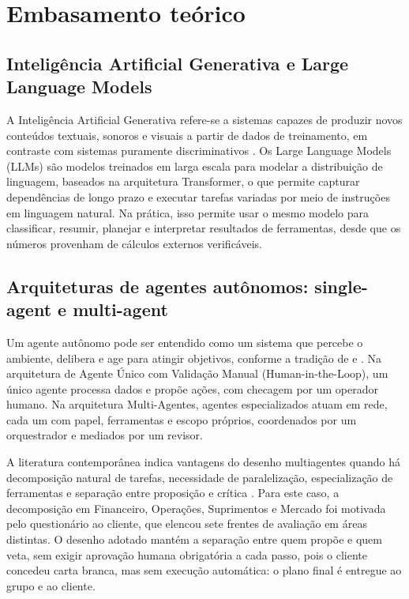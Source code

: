 \documentclass[12pt,a4paper,oneside,brazil]{abntex2}
\begin{document}
\chapter{Embasamento teórico}
\section{Inteligência Artificial Generativa e Large Language Models}

A Inteligência Artificial Generativa refere-se a sistemas capazes de produzir novos conteúdos textuais, sonoros e visuais a partir de dados de treinamento, em contraste com sistemas puramente discriminativos \cite{vaswani2017attention}. Os Large Language Models (LLMs) são modelos treinados em larga escala para modelar a distribuição de linguagem, baseados na arquitetura Transformer, o que permite capturar dependências de longo prazo e executar tarefas variadas por meio de instruções em linguagem natural. Na prática, isso permite usar o mesmo modelo para classificar, resumir, planejar e interpretar resultados de ferramentas, desde que os números provenham de cálculos externos verificáveis.

\section{Arquiteturas de agentes autônomos: single-agent e multi-agent}

Um agente autônomo pode ser entendido como um sistema que percebe o ambiente, delibera e age para atingir objetivos, conforme a tradição de \cite{russell2020artificial} e \cite{wooldridge2009multiagent}. Na arquitetura de Agente Único com Validação Manual (Human-in-the-Loop), um único agente processa dados e propõe ações, com checagem por um operador humano. Na arquitetura Multi-Agentes, agentes especializados atuam em rede, cada um com papel, ferramentas e escopo próprios, coordenados por um orquestrador e mediados por um revisor.

A literatura contemporânea indica vantagens do desenho multiagentes quando há decomposição natural de tarefas, necessidade de paralelização, especialização de ferramentas e separação entre proposição e crítica \cite{xi2023survey}. Para este caso, a decomposição em Financeiro, Operações, Suprimentos e Mercado foi motivada pelo questionário ao cliente, que elencou sete frentes de avaliação em áreas distintas. O desenho adotado mantém a separação entre quem propõe e quem veta, sem exigir aprovação humana obrigatória a cada passo, pois o cliente concedeu carta branca, mas sem execução automática: o plano final é entregue ao grupo e ao cliente.
\end{document}
